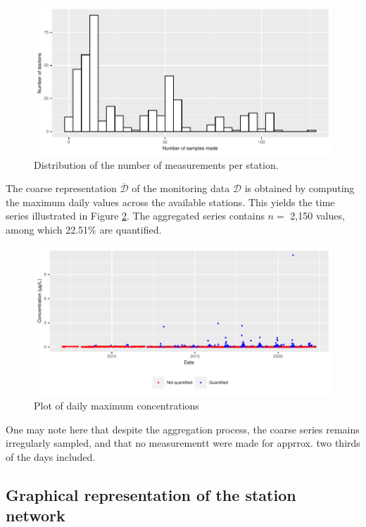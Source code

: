 \begin{figure}[htbp]
  \centering
  \includegraphics[]{figs/Chap5/hist_samp_sta.pdf}
  \caption{Distribution of the number of measurements per station.}
  \label{fig:histogram}
\end{figure}

The coarse representation $\overline{\mathcal{D}}$ of the monitoring data $\mathcal{D}$ is obtained by computing the maximum daily values across the available stations. This yields the time series illustrated in Figure \ref{time:serie}. The aggregated series contains $n =$ 2,150 values, among which 22.51\% are quantified. 

\begin{figure}[htbp]
  \centering
  \includegraphics[]{figs/Chap5/Max_temp-1.pdf}
  \caption{Plot of daily maximum concentrations}
  \label{time:serie}
\end{figure}

One may note here that despite the aggregation process, the coarse series remains irregularly sampled, and that no measurementt were made for apprrox. two thirds of the days included. 

\subsection{Graphical representation of the station network}\label{subsection:graph:construct}

